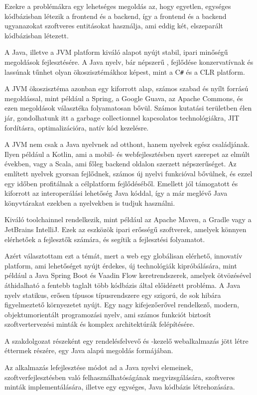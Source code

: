 Ezekre a problémákra egy lehetséges megoldás az, hogy egyetlen, egységes kódbázisban létezik a frontend és a backend, így a frontend és a backend ugyanazokat szoftveres entitásokat használja, ami eddig két, elszeparált kódbázisban létezett.\par

A Java, illetve a JVM platform kiváló alapot nyújt stabil, ipari minőségű megoldások fejlesztésére. A Java nyelv, bár népszerű \cite{tiobeIndex}, fejlődése konzervatívnak és lassúnak tűnhet olyan ökoszisztémákhoz képest, mint a C\verb|#| és a CLR platform. \par

A JVM ökoszisztéma azonban egy kiforrott alap, számos szabad és nyílt forrású megoldással, mint például a Spring, a Google Guava, az Apache Commons, és ezen megoldások választéka folyamatosan bővül. Számos kutatási területben élen jár, gondolhatunk itt a garbage collectionnel kapcsolatos technológiákra, JIT fordításra, optimalizációra, natív kód kezelésre.
\par

A JVM nem csak a Java nyelvnek ad otthont, hanem nyelvek egész családjának. Ilyen például a Kotlin, ami a mobil- és webfejlesztésben nyert szerepet az elmúlt években, vagy a Scala, ami főleg backend oldalon szerzett népszerűséget. Az említett nyelvek gyorsan fejlődnek, számos új nyelvi funkcióval bővülnek, és ezzel egy időben profitálnak a célplatform fejlődéséből. Emellett jól támogatott és kiforrott az interoperálási lehetőség Java kóddal, így a már meglévő Java könyvtárakat ezekben a nyelvekben is tudjuk használni. \par

Kiváló toolchainnel rendelkezik, mint például az Apache Maven, a Gradle vagy a JetBrains IntelliJ. Ezek az eszközök ipari erősségű szoftverek, amelyek könnyen elérhetőek a fejlesztők számára, és segítik a fejlesztési folyamatot. \par

Azért választottam ezt a témát, mert a web egy globálisan elérhető, innovatív platform, ami lehetőséget nyújt érdekes, új technológiák kipróbálására, mint például a Java Spring Boot és Vaadin Flow keretrendszerek, amelyek ötvözésével áthidalható a fentebb taglalt több kódbázis által előidézett probléma. A Java nyelv statikus, erősen típusos típusrendszere egy szigorú, de sok hibára figyelmeztető környezetet nyújt. Egy nagy kifejezőerővel rendelkező, modern, objektumorientált programozási nyelv, ami számos funkciót biztosít szoftvertervezési minták és komplex architektúrák felépítésére. \par

A szakdolgozat részeként egy rendelésfelvevő és -kezelő webalkalmazás jött létre éttermek részére, egy Java alapú megoldás formájában. \par

Az alkalmazás lefejlesztése módot ad a Java nyelvi elemeinek, szoftverfejlesztésben való felhasználhatóságának megvizsgálására, szoftveres minták implementálására, illetve egy egységes, Java kódbázis létrehozására. \par
